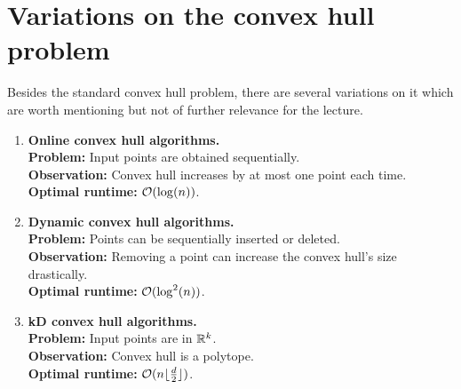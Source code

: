 \section{Variations on the convex hull problem}
    Besides the standard convex hull problem, there are several variations on it which are worth mentioning but not of further relevance for the lecture.
    \begin{enumerate}
        \item \textbf{Online convex hull algorithms.} \\
        \textbf{Problem:} Input points are obtained sequentially. \\
        \textbf{Observation:} Convex hull increases by at most one point each time. \\
        \textbf{Optimal runtime:} $\mathcal{O}(\log(n))$.
        
        \item \textbf{Dynamic convex hull algorithms.} \\
        \textbf{Problem:} Points can be sequentially inserted or deleted. \\
        \textbf{Observation:} Removing a point can increase the convex hull's size drastically. \\
        \textbf{Optimal runtime:} $\mathcal{O}(\log^2(n))$.
        
        \item \textbf{kD convex hull algorithms.} \\
        \textbf{Problem:} Input points are in $\mathbb{R}^k$. \\
        \textbf{Observation:} Convex hull is a polytope. \\
        \textbf{Optimal runtime:} $\mathcal{O}(n\lfloor \frac{d}{2} \rfloor)$.
    \end{enumerate}